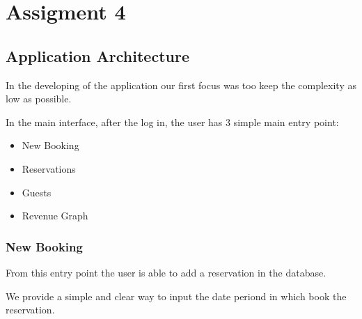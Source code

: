 
\section{Assigment 4}

\graphicspath{ {./img_presentation_4/} }

\setlength{\fboxsep}{15pt}
\setlength{\fboxrule}{0pt}

\subsection{Application Architecture}

In the developing of the application our first focus was too keep the complexity as low as possible.

In the main interface, after the log in, the user has 3 simple main entry point:

\begin{itemize}
  \item New Booking
  \item Reservations
  \item Guests
  \item Revenue Graph
\end{itemize}

\subsubsection{New Booking}

From this entry point the user is able to add a reservation in the database.

We provide a simple and clear way to input the date periond in which book the reservation.


